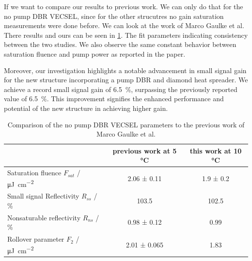 If we want to compare our results to previous work. We can only do that for the no pump DBR VECSEL, since for the other strucutres no gain saturation measurements were done before. We can look at the work of Marco Gaulke et al. There results and ours can be seen in \cref{tab:comp}. 
The fit parameters indicating consistency between the two studies. We also observe the same constant behavior between saturation fluence and pump power as reported in the paper. 

Moreover, our investigation highlights a notable advancement in small signal gain for the new structure incorporating a pump DBR and diamond heat spreader. We achieve a record small signal gain of \qty{6.5}{\percent}, surpassing the previously reported value of \qty{6.5}{\percent}. This improvement signifies the enhanced performance and potential of the new structure in achieving higher gain.
\begin{table}[ht]
    \begin{tabular}{lcc}
        \cline{2-3}
                                                                      & previous work at 5 °C & this work at 10 °C \\ \hline
        Saturation fluence $F_{sat}$ / \unit{\micro\J\per\cm\squared} & 2.06 ± 0.11                                                                          & 1.9 ± 0.2                                                                        \\\hline
        Small signal Reflectivity $R_{ss}$ / \%                       & 103.5                                                                                & 102.5                                                                            \\\hline
        Nonsaturable reflectivity $R_{ns}$ / \%                       & 0.98 ± 0.12                                                                          & 0.99                                                                             \\\hline
        Rollover parameter $F_{2}$ / \unit{\micro\J\per\cm\squared}  & 2.01 ± 0.065                                                                         & 1.83
    \end{tabular}
    \caption{Comparison of the no pump DBR VECSEL parameters to the previous work of Marco Gaulke et al.}
    \label{tab:comp}
\end{table}
\vspace{-2\baselineskip}
